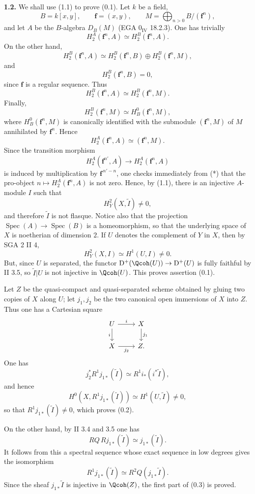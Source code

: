 \documentclass[11pt]{article}
\newcommand{\Spec}{\operatorname{Spec}}
\begin{document}
\textbf{1.2.} We shall use (1.1) to prove (0.1). Let $k$ be a field,
\[
 B=k[x,y],\qquad \mathbf f=(x,y),\qquad
 M=\bigoplus_{n>0}B/(\mathbf f^n),
\]
and let $A$ be the $B$-algebra $D_B(M)$ (EGA $0_{\mathrm{IV}}$ 18.2.3). One has trivially
\[
 H_2^A(\mathbf f^n,A)\simeq H_2^B(\mathbf f^n,A).
\]
On the other hand,
\[
 H_2^B(\mathbf f^n,A)\simeq H_2^B(\mathbf f^n,B)\oplus H_2^B(\mathbf f^n,M),
\]
and
\[
 H_2^B(\mathbf f^n,B)=0,
\]
since $\mathbf f$ is a regular sequence. Thus
\[
 H_2^B(\mathbf f^n,A)\simeq H_2^B(\mathbf f^n,M).
\]
Finally,
\[
 H_2^B(\mathbf f^n,M)\simeq H_B^0(\mathbf f^n,M),
\]
where $H_B^0(\mathbf f^n,M)$ is canonically identified with the submodule $(\mathbf f^n,M)$ of $M$ annihilated by $\mathbf f^n$. Hence
\begin{equation}\tag{*}
 H_2^A(\mathbf f^n,A)\simeq (\mathbf f^n,M).
\end{equation}
Since the transition morphism
\[
 H_2^A(\mathbf f^{n'},A)\longrightarrow H_2^A(\mathbf f^n,A)
\]
is induced by multiplication by $\mathbf f^{\,n'-n}$, one checks immediately from (*) that the pro-object $n\mapsto H_2^A(\mathbf f^n,A)$ is not zero. Hence, by (1.1), there is an injective $A$-module $I$ such that
\[
 H^2_Y(X,\widetilde I)\ne0,
\]
and therefore $\widetilde I$ is not flasque. Notice also that the projection $\Spec(A)\to\Spec(B)$ is a homeomorphism, so that the underlying space of $X$ is noetherian of dimension $2$. If $U$ denotes the complement of $Y$ in $X$, then by SGA 2 II 4,
\[
 H^2_Y(X,I)\simeq H^1(U,I)\ne0.
\]
But, since $U$ is separated, the functor $\mathrm D^+(\Qcoh(U))\to\mathrm D^+(U)$ is fully faithful by II 3.5, so $\widetilde I|U$ is not injective in $\Qcoh(U)$. This proves assertion (0.1).

Let $Z$ be the quasi-compact and quasi-separated scheme obtained by gluing two copies of $X$ along $U$; let $j_1,j_2$ be the two canonical open immersions of $X$ into $Z$. Thus one has a Cartesian square
\[
\begin{tikzcd}
 U \arrow[r,"i"] \arrow[d,"i"'] & X \arrow[d,"j_1"]\\
 X \arrow[r,"j_2"'] & Z .
\end{tikzcd}
\]
One has
\[
 j_2^*R^1j_{1*}(\widetilde I)\simeq R^1i_*(i^*\widetilde I),
\]
and hence
\[
 H^0(X,R^1j_{1*}(\widetilde I))\simeq H^1(U,\widetilde I)\ne0,
\]
so that $R^1j_{1*}(\widetilde I)\ne0$, which proves (0.2).

On the other hand, by II 3.4 and 3.5 one has
\[
 RQ\,Rj_{1*}(\widetilde I)\simeq j_{1*}(\widetilde I).
\]
It follows from this a spectral sequence whose exact sequence in low degrees gives the isomorphism
\[
 R^1j_{1*}(\widetilde I)\simeq R^2Q(j_{1*}\widetilde I).
\]
Since the sheaf $j_{1*}\widetilde I$ is injective in $\Qcoh(Z)$, the first part of (0.3) is proved.
\end{document}
